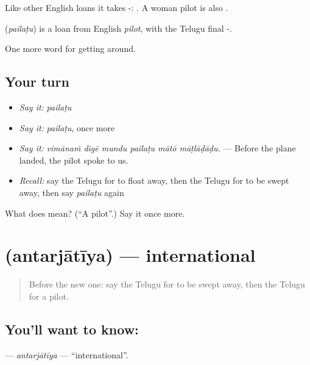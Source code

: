 Like other English loans it takes -: . A woman pilot is also .

\begin{cousinweb}
\textbf{} (\emph{pailaṭu}) is a loan from English \emph{pilot}, with the Telugu final -.
\end{cousinweb}

\begin{grammarlens}[title={What you've built}]
One more word for getting around.
\end{grammarlens}

\subsection*{Your turn}
\begin{itemize}
\raggedright
  \item \emph{Say it:} \emph{pailaṭu}
  \item \emph{Say it:} \emph{pailaṭu}, once more
  \item \emph{Say it:} \emph{vimānaṁ digē mundu pailaṭu mātō māṭlāḍāḍu.} — Before the plane landed, the pilot spoke to us.
  \item \emph{Recall:} say the Telugu for to float away, then the Telugu for to be swept away, then say \emph{pailaṭu} again
\end{itemize}

\begin{tcolorbox}[breakable,colback=teal!4,colframe=teal!35!black,title={Before you move on}]
What does  mean? (\textquotedblleft{}A pilot\textquotedblright{}.) Say it once more.
\end{tcolorbox}
\section[\texorpdfstring{\te{అంతర్జాతీయ} (antarjātīya)}{అంతర్జాతీయ (antarjātīya)}]{ (antarjātīya) — international}

\label{lesson:TE-C454-antarjatiya}



\begin{quote}
Before the new one: say the Telugu for to be swept away, then the Telugu for a pilot.
\end{quote}

\subsection*{You'll want to know: }
\textbf{} — \emph{antarjātīya} — \textquotedblleft{}international\textquotedblright{}.

